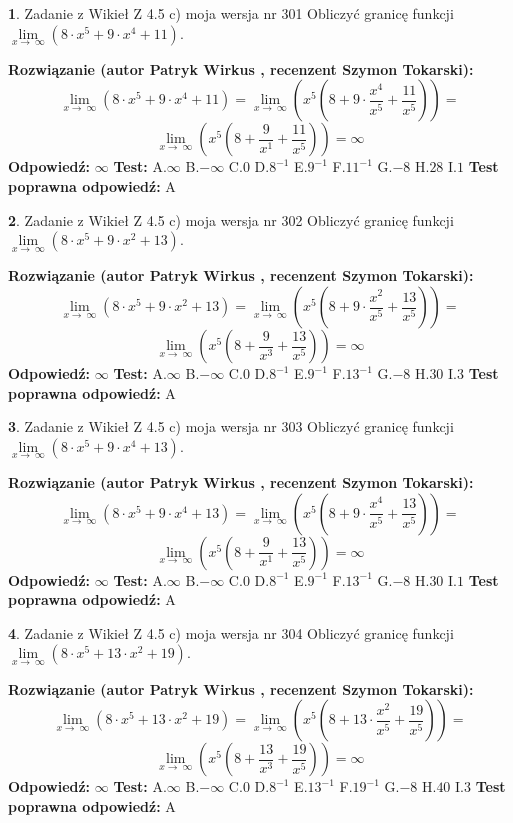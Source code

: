 \documentclass[12pt, a4paper]{article}
\theoremstyle{definition} %
\newtheorem{zad}{}
\newcommand{\zadStart}[1]{\begin{zad}#1\newline}
\newcommand{\zadStop}{\end{zad}}
\newcommand{\rozwStart}[2]{\noindent \textbf{Rozwiązanie (autor #1 , recenzent #2): }\newline}
\newcommand{\rozwStop}{\newline}
\newcommand{\odpStart}{\noindent \textbf{Odpowiedź:}\newline}
\newcommand{\odpStop}{\newline}
\newcommand{\testStart}{\noindent \textbf{Test:}\newline}
\newcommand{\testStop}{\newline}
\newcommand{\kluczStart}{\noindent \textbf{Test poprawna odpowiedź:}\newline}
\newcommand{\kluczStop}{\newline}
\begin{document}
\zadStart{Zadanie z Wikieł Z 4.5 c) moja wersja nr 301}
Obliczyć granicę funkcji  $\lim\limits_{x\to\ \infty}(8 \cdot x^{5}+9 \cdot x^{4}+11)$.
\zadStop
\rozwStart{Patryk Wirkus}{Szymon Tokarski}
$$\lim\limits_{x\to\ \infty}(8 \cdot x^{5}+9 \cdot x^{4}+11) = \lim\limits_{x\to\ \infty}(x^{5}(8 +9 \cdot \frac{x^{4}}{x^{5}}+\frac{11}{x^{5}})) =$$ $$\lim\limits_{x\to\ \infty}(x^{5}(8 +\frac{9}{x^{1}}+\frac{11}{x^{5}})) =\infty$$
\rozwStop
\odpStart
$\infty$
\odpStop
\testStart
A.$\infty$ B.$-\infty$ C.$0$ D.$8^{-1}$ E.$9^{-1}$
F.$11^{-1}$ G.$-8$
H.$28$
I.$1$
\testStop
\kluczStart
A
\kluczStop



\zadStart{Zadanie z Wikieł Z 4.5 c) moja wersja nr 302}
Obliczyć granicę funkcji  $\lim\limits_{x\to\ \infty}(8 \cdot x^{5}+9 \cdot x^{2}+13)$.
\zadStop
\rozwStart{Patryk Wirkus}{Szymon Tokarski}
$$\lim\limits_{x\to\ \infty}(8 \cdot x^{5}+9 \cdot x^{2}+13) = \lim\limits_{x\to\ \infty}(x^{5}(8 +9 \cdot \frac{x^{2}}{x^{5}}+\frac{13}{x^{5}})) =$$ $$\lim\limits_{x\to\ \infty}(x^{5}(8 +\frac{9}{x^{3}}+\frac{13}{x^{5}})) =\infty$$
\rozwStop
\odpStart
$\infty$
\odpStop
\testStart
A.$\infty$ B.$-\infty$ C.$0$ D.$8^{-1}$ E.$9^{-1}$
F.$13^{-1}$ G.$-8$
H.$30$
I.$3$
\testStop
\kluczStart
A
\kluczStop



\zadStart{Zadanie z Wikieł Z 4.5 c) moja wersja nr 303}
Obliczyć granicę funkcji  $\lim\limits_{x\to\ \infty}(8 \cdot x^{5}+9 \cdot x^{4}+13)$.
\zadStop
\rozwStart{Patryk Wirkus}{Szymon Tokarski}
$$\lim\limits_{x\to\ \infty}(8 \cdot x^{5}+9 \cdot x^{4}+13) = \lim\limits_{x\to\ \infty}(x^{5}(8 +9 \cdot \frac{x^{4}}{x^{5}}+\frac{13}{x^{5}})) =$$ $$\lim\limits_{x\to\ \infty}(x^{5}(8 +\frac{9}{x^{1}}+\frac{13}{x^{5}})) =\infty$$
\rozwStop
\odpStart
$\infty$
\odpStop
\testStart
A.$\infty$ B.$-\infty$ C.$0$ D.$8^{-1}$ E.$9^{-1}$
F.$13^{-1}$ G.$-8$
H.$30$
I.$1$
\testStop
\kluczStart
A
\kluczStop



\zadStart{Zadanie z Wikieł Z 4.5 c) moja wersja nr 304}
Obliczyć granicę funkcji  $\lim\limits_{x\to\ \infty}(8 \cdot x^{5}+13 \cdot x^{2}+19)$.
\zadStop
\rozwStart{Patryk Wirkus}{Szymon Tokarski}
$$\lim\limits_{x\to\ \infty}(8 \cdot x^{5}+13 \cdot x^{2}+19) = \lim\limits_{x\to\ \infty}(x^{5}(8 +13 \cdot \frac{x^{2}}{x^{5}}+\frac{19}{x^{5}})) =$$ $$\lim\limits_{x\to\ \infty}(x^{5}(8 +\frac{13}{x^{3}}+\frac{19}{x^{5}})) =\infty$$
\rozwStop
\odpStart
$\infty$
\odpStop
\testStart
A.$\infty$ B.$-\infty$ C.$0$ D.$8^{-1}$ E.$13^{-1}$
F.$19^{-1}$ G.$-8$
H.$40$
I.$3$
\testStop
\kluczStart
A
\kluczStop
\end{document}
